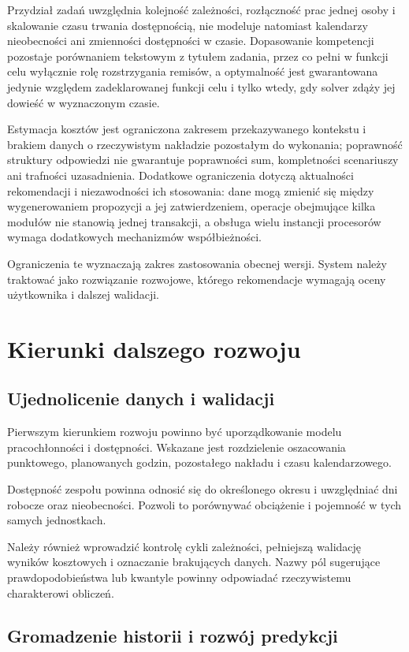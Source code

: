 Przydział zadań uwzględnia kolejność zależności, rozłączność prac jednej osoby i skalowanie czasu trwania dostępnością, nie modeluje natomiast kalendarzy nieobecności ani zmienności dostępności w czasie. Dopasowanie kompetencji pozostaje porównaniem tekstowym z tytułem zadania, przez co pełni w funkcji celu wyłącznie rolę rozstrzygania remisów, a optymalność jest gwarantowana jedynie względem zadeklarowanej funkcji celu i tylko wtedy, gdy solver zdąży jej dowieść w wyznaczonym czasie.

Estymacja kosztów jest ograniczona zakresem przekazywanego kontekstu i brakiem danych o rzeczywistym nakładzie pozostałym do wykonania; poprawność struktury odpowiedzi nie gwarantuje poprawności sum, kompletności scenariuszy ani trafności uzasadnienia. Dodatkowe ograniczenia dotyczą aktualności rekomendacji i niezawodności ich stosowania: dane mogą zmienić się między wygenerowaniem propozycji a jej zatwierdzeniem, operacje obejmujące kilka modułów nie stanowią jednej transakcji, a obsługa wielu instancji procesorów wymaga dodatkowych mechanizmów współbieżności.

Ograniczenia te wyznaczają zakres zastosowania obecnej wersji. System należy traktować jako rozwiązanie rozwojowe, którego rekomendacje wymagają oceny użytkownika i dalszej walidacji.

\section{Kierunki dalszego rozwoju}

\subsection{Ujednolicenie danych i walidacji}

Pierwszym kierunkiem rozwoju powinno być uporządkowanie modelu pracochłonności i dostępności. Wskazane jest rozdzielenie oszacowania punktowego, planowanych godzin, pozostałego nakładu i czasu kalendarzowego.

Dostępność zespołu powinna odnosić się do określonego okresu i uwzględniać dni robocze oraz nieobecności. Pozwoli to porównywać obciążenie i pojemność w tych samych jednostkach.

Należy również wprowadzić kontrolę cykli zależności, pełniejszą walidację wyników kosztowych i oznaczanie brakujących danych. Nazwy pól sugerujące prawdopodobieństwa lub kwantyle powinny odpowiadać rzeczywistemu charakterowi obliczeń.

\subsection{Gromadzenie historii i rozwój predykcji}

